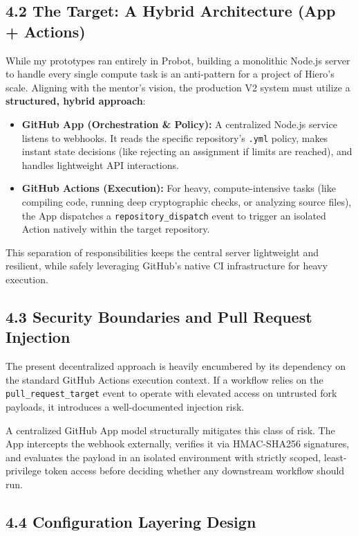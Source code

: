 \documentclass[11pt]{article}
\begin{document}
\subsection*{4.2 The Target: A Hybrid Architecture (App + Actions)}

While my prototypes ran entirely in Probot, building a monolithic Node.js server to handle every single compute task is an anti-pattern for a project of Hiero's scale. Aligning with the mentor's vision, the production V2 system must utilize a \textbf{structured, hybrid approach}:
\begin{itemize}[leftmargin=18pt,itemsep=2pt,topsep=2pt]
    \item \textbf{GitHub App (Orchestration \& Policy):} A centralized Node.js service listens to webhooks. It reads the specific repository's \texttt{.yml} policy, makes instant state decisions (like rejecting an assignment if limits are reached), and handles lightweight API interactions.
    \item \textbf{GitHub Actions (Execution):} For heavy, compute-intensive tasks (like compiling code, running deep cryptographic checks, or analyzing source files), the App dispatches a \texttt{repository\_dispatch} event to trigger an isolated Action natively within the target repository. 
\end{itemize}
This separation of responsibilities keeps the central server lightweight and resilient, while safely leveraging GitHub's native CI infrastructure for heavy execution.

\subsection*{4.3 Security Boundaries and Pull Request Injection}

The present decentralized approach is heavily encumbered by its dependency on the standard GitHub Actions execution context. If a workflow relies on the \texttt{pull\_request\_target} event to operate with elevated access on untrusted fork payloads, it introduces a well-documented injection risk. 

A centralized GitHub App model structurally mitigates this class of risk. The App intercepts the webhook externally, verifies it via HMAC-SHA256 signatures, and evaluates the payload in an isolated environment with strictly scoped, least-privilege token access before deciding whether any downstream workflow should run.

\subsection*{4.4 Configuration Layering Design}
\end{document}
